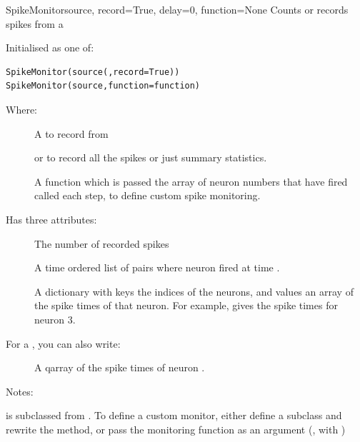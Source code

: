 \documentclass[letterpaper,10pt,english]{manual}
\begin{document}
\hypertarget{brian.SpikeMonitor}{}\begin{classdesc}{SpikeMonitor}{source, record=True, delay=0, function=None}
Counts or records spikes from a \hyperlink{brian.NeuronGroup}{}

Initialised as one of:

\begin{Verbatim}[commandchars=@\[\]]
SpikeMonitor(source(,record=True))
SpikeMonitor(source,function=function)
\end{Verbatim}

Where:
\begin{description}
\item[]
A \hyperlink{brian.NeuronGroup}{} to record from

\item[]
 or  to record all the spikes or just summary
statistics.

\item[]
A function  which is passed the array of neuron
numbers that have fired called each step, to define
custom spike monitoring.

\end{description}

Has three attributes:
\begin{description}
\item[]
The number of recorded spikes

\item[]
A time ordered list of pairs  where neuron  fired
at time .

\item[]
A dictionary with keys the indices of the neurons, and values an
array of the spike times of that neuron. For example,
 gives the spike times for neuron 3.

\end{description}

For  a \hyperlink{brian.SpikeMonitor}{}, you can also write:
\begin{description}
\item[]
A qarray of the spike times of neuron .

\end{description}

Notes:

\hyperlink{brian.SpikeMonitor}{} is subclassed from \hyperlink{brian.Connection}{}.
To define a custom monitor, either define a subclass and
rewrite the  method, or pass the monitoring function
as an argument (, with )
\end{classdesc}
\end{document}
